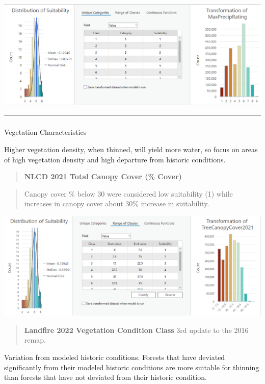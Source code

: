 \documentclass[
  number]{elsarticle}
\makeatletter
\let\oldsubparagraph\subparagraph
\renewcommand{\subparagraph}{
    \@ifstar
      \xxxSubParagraphStar
      \xxxSubParagraphNoStar
  }
\newcommand{\xxxSubParagraphStar}[1]{\oldsubparagraph*{#1}\mbox{}}
\newcommand{\xxxSubParagraphNoStar}[1]{\oldsubparagraph{#1}\mbox{}}
\makeatother
\begin{document}
\includegraphics{images/Precipitation_suitability.PNG}

\begin{center}\rule{0.5\linewidth}{0.5pt}\end{center}

\subparagraph{Vegetation
Characteristics}\label{vegetation-characteristics}

Higher vegetation density, when thinned, will yield more water, so focus
on areas of high vegetation density and high departure from historic
conditions.

\begin{quote}
\textbf{NLCD 2021 Total Canopy Cover (\% Cover)}
\end{quote}

\begin{quote}
Canopy cover \% below 30 were considered low suitability (1) while
increases in canopy cover about 30\% increase in suitability.
\end{quote}

\includegraphics{images/CanopyCover_suitability.PNG}

\begin{quote}
\textbf{Landfire 2022 Vegetation Condition Class} 3rd update to the 2016
remap.
\end{quote}

Variation from modeled historic conditions. Forests that have deviated
significantly from their modeled historic conditions are more suitable
for thinning than forests that have not deviated from their historic
condition.
\end{document}

